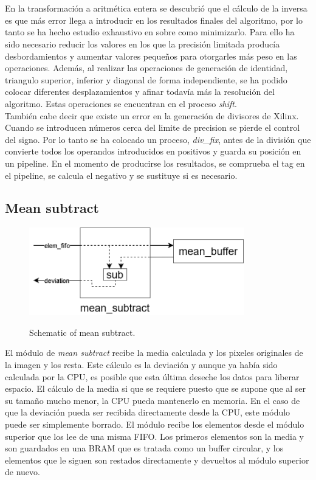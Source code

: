 \\
\\
En la transformación a aritmética entera se descubrió que el cálculo de la inversa es que más error llega a introducir en los resultados finales del algoritmo, por lo tanto se ha hecho estudio exhaustivo en  sobre como minimizarlo. Para ello ha sido necesario reducir los valores en los que la precisión limitada producía desbordamientos y aumentar valores pequeños para otorgarles más peso en las operaciones. Además, al realizar las operaciones de generación de identidad, triangulo superior, inferior y diagonal de forma independiente, se ha podido colocar diferentes desplazamientos y afinar todavía más la resolución del algoritmo. Estas operaciones se encuentran en el proceso \textit{shift}.
\\
También cabe decir que existe un error en la generación de divisores de Xilinx. Cuando se introducen números cerca del limite de precision se pierde el control del signo. Por lo tanto se ha colocado un proceso, \textit{div\_fix}, antes de la división que convierte todos los operandos introducidos en positivos y guarda su posición en un pipeline. En el momento de producirse los resultados, se comprueba el tag en el pipeline, se calcula el negativo y se sustituye si es necesario.

\subsection{Mean subtract}

\begin{figure}[h!]
\centering\textbf{
\includegraphics[height=1.5in]{figures/subtract.png}}
\caption{Schematic of mean subtract.}
  \label{fig:subtract}
\end{figure}
El módulo de \textit{mean subtract} recibe la media calculada y los pixeles originales de la imagen y los resta. Este cálculo es la deviación y aunque ya había sido calculada por la CPU, es posible que esta última deseche los datos para liberar espacio. El cálculo de la media si que se requiere puesto que se supone que al ser su tamaño mucho menor, la CPU pueda mantenerlo en memoria. En el caso de que la deviación pueda ser recibida directamente desde la CPU, este módulo puede ser simplemente borrado.
El módulo recibe los elementos desde el módulo superior que los lee de una misma FIFO. Los primeros elementos son la media y son guardados en una BRAM que es tratada como un buffer circular, y los elementos que le siguen son restados directamente y devueltos al módulo superior de nuevo.


